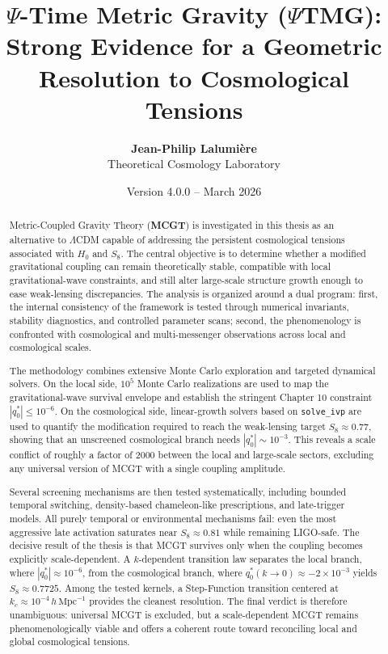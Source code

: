 \documentclass[11pt, a4paper]{article}
\title{\textbf{\Huge $\Psi$-Time Metric Gravity ($\Psi$TMG): Strong Evidence for a Geometric Resolution to Cosmological Tensions}}
\author{\textbf{Jean-Philip Lalumi\`ere} \\ Theoretical Cosmology Laboratory}
\date{Version 4.0.0 -- March 2026}
\begin{document}
\maketitle

\begin{abstract}
\noindent Metric-Coupled Gravity Theory (\textbf{MCGT}) is investigated in this thesis as an alternative to $\Lambda$CDM capable of addressing the persistent cosmological tensions associated with $H_0$ and $S_8$. The central objective is to determine whether a modified gravitational coupling can remain theoretically stable, compatible with local gravitational-wave constraints, and still alter large-scale structure growth enough to ease weak-lensing discrepancies. The analysis is organized around a dual program: first, the internal consistency of the framework is tested through numerical invariants, stability diagnostics, and controlled parameter scans; second, the phenomenology is confronted with cosmological and multi-messenger observations across local and cosmological scales.

The methodology combines extensive Monte Carlo exploration and targeted dynamical solvers. On the local side, $10^5$ Monte Carlo realizations are used to map the gravitational-wave survival envelope and establish the stringent Chapter 10 constraint $|q_0^*| \le 10^{-6}$. On the cosmological side, linear-growth solvers based on \texttt{solve\_ivp} are used to quantify the modification required to reach the weak-lensing target $S_8 \approx 0.77$, showing that an unscreened cosmological branch needs $|q_0^*| \sim 10^{-3}$. This reveals a scale conflict of roughly a factor of 2000 between the local and large-scale sectors, excluding any universal version of MCGT with a single coupling amplitude.

Several screening mechanisms are then tested systematically, including bounded temporal switching, density-based chameleon-like prescriptions, and late-trigger models. All purely temporal or environmental mechanisms fail: even the most aggressive late activation saturates near $S_8 \approx 0.81$ while remaining LIGO-safe. The decisive result of the thesis is that MCGT survives only when the coupling becomes explicitly scale-dependent. A $k$-dependent transition law separates the local branch, where $|q_0^*| \approx 10^{-6}$, from the cosmological branch, where $q_0^*(k \rightarrow 0) \approx -2 \times 10^{-3}$ yields $S_8 \approx 0.7725$. Among the tested kernels, a Step-Function transition centered at $k_c \approx 10^{-4}\,h\,\mathrm{Mpc}^{-1}$ provides the cleanest resolution. The final verdict is therefore unambiguous: universal MCGT is excluded, but a scale-dependent MCGT remains phenomenologically viable and offers a coherent route toward reconciling local and global cosmological tensions.
\end{abstract}
\end{document}
